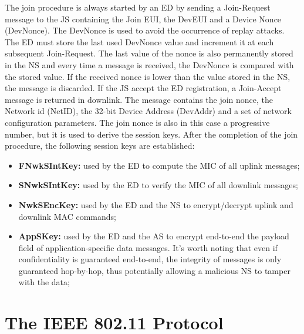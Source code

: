 The join procedure is always started by an \gls{ED} by sending a Join-Request message to the \gls{JS} containing the Join EUI, the DevEUI and a Device Nonce (DevNonce). The DevNonce is used to avoid the occurrence of replay attacks. The \gls{ED} must store the last used DevNonce value and increment it at each subsequent Join-Request. The last value of the nonce is also permanently stored in the \gls{NS} and every time a message is received, the DevNonce is compared with the stored value. If the received nonce is lower than the value stored in the \gls{NS}, the message is discarded. If the \gls{JS} accept the \gls{ED} registration, a Join-Accept message is returned in downlink. The message contains the join nonce, the Network id (NetID), the 32-bit Device Address (DevAddr) and a set of network configuration parameters. The join nonce is also in this case a progressive number, but it is used to derive the session keys. After the completion of the join procedure, the following session keys are established:

\begin{itemize}

\item \textbf{FNwkSIntKey:} used by the \gls{ED} to compute the \gls{MIC} of all uplink messages;
\item \textbf{SNwkSIntKey:} used by the \gls{ED} to verify the \gls{MIC} of all downlink messages;
\item \textbf{NwkSEncKey:} used by the \gls{ED} and the \gls{NS} to encrypt/decrypt uplink and downlink MAC commands;
\item \textbf{AppSKey:} used by the \gls{ED} and the \gls{AS} to encrypt end-to-end the payload field of application-specific data messages. It's worth noting that even if confidentiality is guaranteed end-to-end, the integrity of messages is only guaranteed hop-by-hop, thus potentially allowing a malicious \gls{NS} to tamper with the data;

\end{itemize}


\section{The IEEE 802.11 Protocol}


